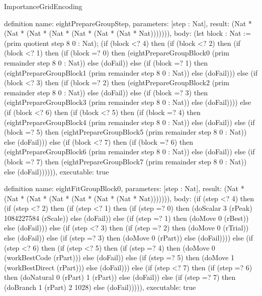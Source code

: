 \begin{lexlean}{ImportanceGridEncoding}
\begin{semanticmodule}
definition{
  name: eightPrepareGroupStep,
  parameters: [step : Nat],
  result: (Nat * (Nat * (Nat * (Nat * (Nat * (Nat * (Nat * Nat))))))),
  body: (let block : Nat := (prim quotient step 8 0 : Nat); (if (block <? 4) then
      (if (block <? 2) then
      (if (block <? 1) then
      (if (block =? 0) then (eightPrepareGroupBlock0 (prim remainder step 8 0 : Nat)) else (doFail)) else
      (if (block =? 1) then (eightPrepareGroupBlock1 (prim remainder step 8 0 : Nat)) else (doFail))) else
      (if (block <? 3) then
      (if (block =? 2) then (eightPrepareGroupBlock2 (prim remainder step 8 0 : Nat)) else (doFail)) else
      (if (block =? 3) then (eightPrepareGroupBlock3 (prim remainder step 8 0 : Nat)) else (doFail)))) else
      (if (block <? 6) then
      (if (block <? 5) then
      (if (block =? 4) then (eightPrepareGroupBlock4 (prim remainder step 8 0 : Nat)) else (doFail)) else
      (if (block =? 5) then (eightPrepareGroupBlock5 (prim remainder step 8 0 : Nat)) else (doFail))) else
      (if (block <? 7) then
      (if (block =? 6) then (eightPrepareGroupBlock6 (prim remainder step 8 0 : Nat)) else (doFail)) else
      (if (block =? 7) then (eightPrepareGroupBlock7 (prim remainder step 8 0 : Nat)) else (doFail)))))),
  executable: true
}

definition{
  name: eightFitGroupBlock0,
  parameters: [step : Nat],
  result: (Nat * (Nat * (Nat * (Nat * (Nat * (Nat * (Nat * Nat))))))),
  body: (if (step <? 4) then
      (if (step <? 2) then
      (if (step <? 1) then
      (if (step =? 0) then (doScalar 3 (rPeak) 1084227584 (rScale)) else (doFail)) else
      (if (step =? 1) then (doMove 0 (rBest)) else (doFail))) else
      (if (step <? 3) then
      (if (step =? 2) then (doMove 0 (rTrial)) else (doFail)) else
      (if (step =? 3) then (doMove 0 (rPart)) else (doFail)))) else
      (if (step <? 6) then
      (if (step <? 5) then
      (if (step =? 4) then (doMove 0 (workBestCode (rPart))) else (doFail)) else
      (if (step =? 5) then (doMove 1 (workBestDirect (rPart))) else (doFail))) else
      (if (step <? 7) then
      (if (step =? 6) then (doNatural 0 (rPart) 1 (rPart)) else (doFail)) else
      (if (step =? 7) then (doBranch 1 (rPart) 2 1028) else (doFail))))),
  executable: true
}


\end{semanticmodule}
\end{lexlean}
